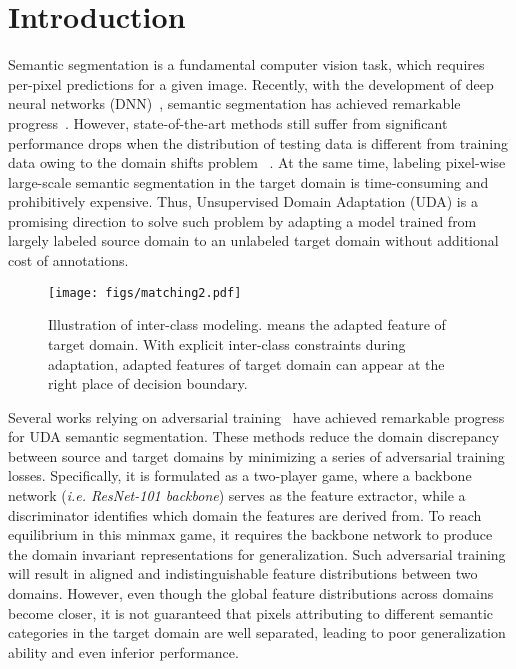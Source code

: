 \documentclass[runningheads]{llncs}
\begin{document}
\section{Introduction}

Semantic segmentation is a fundamental computer vision task, which requires per-pixel predictions for a given image. Recently, with the development of deep neural networks (DNN)~\cite{he2016deep,huang2017densely,wang2020deep,jiang2019video,jiang2020learning,jiang2022stc,xu2022dirl}, semantic segmentation has achieved remarkable progress~\cite{long2015fully,chen2017deeplab,zhao2017pyramid}. However, state-of-the-art methods still suffer from significant performance drops when the distribution of testing data is different from training data owing to the domain shifts problem ~\cite{luo2019taking, pan2020unsupervised, mei2020instance}. At the same time, labeling pixel-wise large-scale semantic segmentation in the target domain is time-consuming and prohibitively expensive. Thus, Unsupervised Domain Adaptation (UDA) is a promising direction to solve such problem by adapting a model trained from largely labeled source domain to an unlabeled target domain without additional cost of annotations. 


\begin{figure}
\centering
\texttt{[image: figs/matching2.pdf]}
\caption{Illustration of inter-class modeling.  means the adapted feature of target domain. With explicit inter-class constraints during adaptation, adapted features of target domain can appear at the right place of decision boundary.}
\label{matching}
\end{figure}

Several works relying on adversarial training~\cite{tsai2018learning, vu2019advent, hoffman2018cycada} have achieved remarkable progress for UDA semantic segmentation. These methods reduce the domain discrepancy between source and target domains by minimizing a series of adversarial training losses. Specifically, it is formulated as a two-player game, where a backbone network ({\em i.e. ResNet-101 backbone}) serves as the feature extractor, while a discriminator identifies which domain the features are derived from. To reach equilibrium in this minmax game, it requires the backbone network to produce the domain invariant representations for generalization. 
Such adversarial training will result in aligned and indistinguishable feature distributions between two domains. However, even though the global feature distributions across domains become closer, it is not guaranteed that pixels attributing to different semantic categories in the target domain are well separated, leading to poor generalization ability and even inferior performance.
\end{document}
